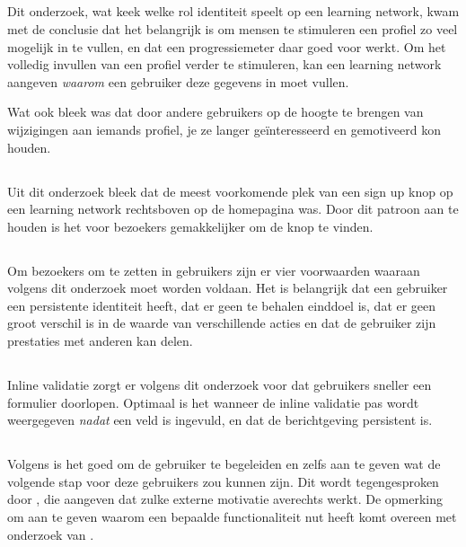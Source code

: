 \documentclass[a4paper, 10pt, pdftex]{report}
\begin{document}
      \subsection{\cite{Brouns2008}}
        Dit onderzoek, wat keek welke rol identiteit speelt op een learning network, kwam met de conclusie dat het belangrijk is om mensen te stimuleren een profiel zo veel mogelijk in te vullen, en dat een progressiemeter daar goed voor werkt. Om het volledig invullen van een profiel verder te stimuleren, kan een learning network aangeven \emph{waarom} een gebruiker deze gegevens in moet vullen.

        Wat ook bleek was dat door andere gebruikers op de hoogte te brengen van wijzigingen aan iemands profiel, je ze langer ge\"interesseerd en gemotiveerd kon houden.

      \subsection{\cite{Editorial2008}}
      Uit dit onderzoek bleek dat de meest voorkomende plek van een sign up knop op een learning network rechtsboven op de homepagina was. Door dit patroon aan te houden is het voor bezoekers gemakkelijker om de knop te vinden.

      \subsection{\cite{Sloep2009}}
      Om bezoekers om te zetten in gebruikers zijn er vier voorwaarden waaraan volgens dit onderzoek moet worden voldaan. Het is belangrijk dat een gebruiker een persistente identiteit heeft, dat er geen te behalen einddoel is, dat er geen groot verschil is in de waarde van verschillende acties en dat de gebruiker zijn prestaties met anderen kan delen.

      \subsection{\cite{Wroblewski2009}}
        Inline validatie zorgt er volgens dit onderzoek voor dat gebruikers sneller een formulier doorlopen. Optimaal is het wanneer de inline validatie pas wordt weergegeven \emph{nadat} een veld is ingevuld, en dat de berichtgeving persistent is.

      \subsection{\cite{Alfrink2008}}
        Volgens \citeauthor{Alfrink2008} is het goed om de gebruiker te begeleiden en zelfs aan te geven wat de volgende stap voor deze gebruikers zou kunnen zijn. Dit wordt tegengesproken door \cite{Beenen2004}, die aangeven dat zulke externe motivatie averechts werkt. De opmerking om aan te geven waarom een bepaalde functionaliteit nut heeft komt overeen met onderzoek van \cite{Brouns2008}.
\end{document}
